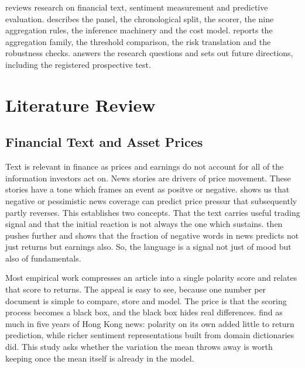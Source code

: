 \documentclass[11pt,a4paper,oneside]{book}
\let\textcite\citet
\let\Textcite\Citet
\newif\ifshowdraftnotes
\newcommand{\draftnote}[1]{%
  \ifshowdraftnotes
    \par\smallskip
    \noindent{\color{draftgrey}\small\itshape Drafting note: #1\par}
    \smallskip
  \fi
}
\begin{document}
 reviews research on financial text, sentiment measurement and predictive evaluation.
 describes the panel, the chronological split, the scorer, the nine aggregation rules, the inference machinery and the cost model.
 reports the aggregation family, the threshold comparison, the risk translation and the robustness checks.
 answers the research questions and sets out future directions, including the registered prospective test.

\chapter{Literature Review}
\label{ch:literature}

\draftnote{Sections \ref{sec:lit-financial-text}, \ref{sec:lit-sentiment-models} and \ref{sec:lit-event-studies} are ported from the July draft and need only light edits. The July draft's disagreement sections are cut; salvage single sentences only where they serve the aggregation question. Add a short subsection on volatility forecasting and HAR before the research gap.}

\section{Financial Text and Asset Prices}
\label{sec:lit-financial-text}

Text is relevant in finance as prices and earnings do not account for all of the information investors act on.
News stories are drivers of price movement. These stories have a tone which frames an event as positve or negative.
\textcite{tetlock2007} shows us that negative or pessimistic news coverage can predict price pressur that subsequently partly reverses.
This establishes two concepts. That the text carries useful trading signal and that the initial reaction is not always the one which sustains.
\textcite{tetlock2008words} then pushes further and shows that the fraction of negative words in news predicts not just returns but earnings also.
So, the language is a signal not just of mood but also of fundamentals.

Most empirical work compresses an article into a single polarity score and relates that score to returns.
The appeal is easy to see, because one number per document is simple to compare, store and model.
The price is that the scoring process becomes a black box, and the black box hides real differences.
\Textcite{li2014news} find as much in five years of Hong Kong news: polarity on its own added little to return prediction, while richer sentiment representations built from domain dictionaries did.
This study asks whether the variation the mean throws away is worth keeping once the mean itself is already in the model.
\end{document}
